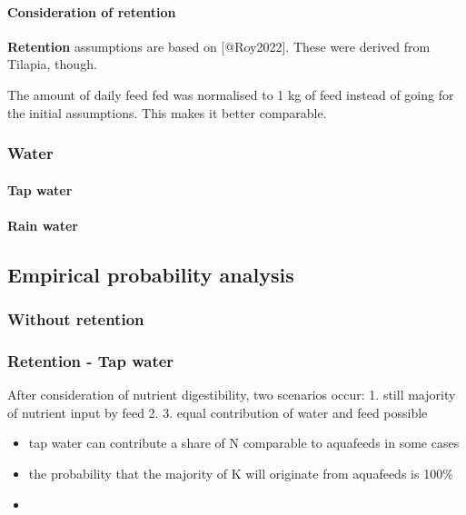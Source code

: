 \documentclass[
]{article}
\providecommand{\tightlist}{%
  \setlength{\itemsep}{0pt}\setlength{\parskip}{0pt}}
\begin{document}
\hypertarget{consideration-of-retention}{%
\paragraph{Consideration of
retention}\label{consideration-of-retention}}

\textbf{Retention} assumptions are based on {[}@Roy2022{]}. These were
derived from Tilapia, though.

The amount of daily feed fed was normalised to 1 kg of feed instead of
going for the initial assumptions. This makes it better comparable.

\hypertarget{water-2}{%
\subsubsection{Water}\label{water-2}}

\hypertarget{tap-water-1}{%
\paragraph{Tap water}\label{tap-water-1}}

\hypertarget{rain-water-1}{%
\paragraph{Rain water}\label{rain-water-1}}

\hypertarget{empirical-probability-analysis}{%
\subsection{Empirical probability
analysis}\label{empirical-probability-analysis}}

\hypertarget{without-retention}{%
\subsubsection{Without retention}\label{without-retention}}

\hypertarget{retention---tap-water}{%
\subsubsection{Retention - Tap water}\label{retention---tap-water}}

After consideration of nutrient digestibility, two scenarios occur: 1.
still majority of nutrient input by feed 2. 3. equal contribution of
water and feed possible

\begin{itemize}
\tightlist
\item
  tap water can contribute a share of N comparable to aquafeeds in some
  cases
\item
  the probability that the majority of K will originate from aquafeeds
  is 100\%
\item
\end{itemize}
\end{document}
